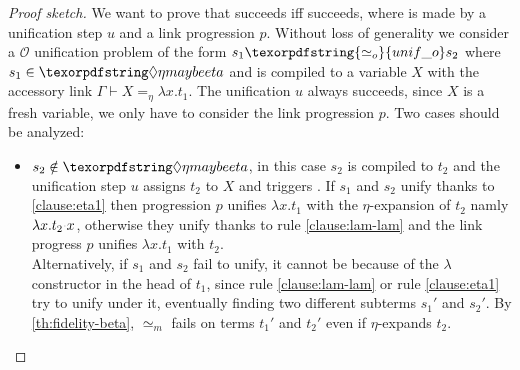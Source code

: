 \documentclass[sigconf,natbib=false,review]{acmart}
\newcommand{\appsep}{\ensuremath{\textcolor{lightgray}{\cdot}}}
\newcommand{\UnifRel}{\ensuremath{\simeq}}
\newcommand{\Uo}{\texorpdfstring{\ensuremath{\UnifRel_o}\xspace}{unif\_o}}
\newcommand{\Ue}{\ensuremath{\UnifRel_m}\xspace}
\newcommand{\Fo}{\texorpdfstring{\ensuremath{\mathcal{O}}\xspace}{O}}
\newcommand{\linketaM}[3]{\ensuremath{#1 \vdash #2 =_\eta #3}}
\newcommand{\linkStore}{\texorpdfstring{\ensuremath{\mathbb{L}}\xspace}{L}}
\newcommand{\hoUnifPb}{\ensuremath{\mathbb{Q}}\xspace}
\begin{document}
\begin{proof}[Proof sketch] %
  We want to prove that \fstep succeeds iff \hstep
  succeeds, where \hstep is made by a unification step $u$ and a link
  progression $p$.
  Without loss of generality we consider a
  \Fo{} unification problem of the form $s_1 \Uo s_2$
  where $s_1 \in \maybeeta$ and is compiled to a variable $X$ with the accessory link
  $\linketaM{\Gamma}{X}{\lambda x.t_1}$. 
  The unification $u$ always succeeds, since $X$ is a fresh variable, we 
  only have to consider the link progression $p$.
  Two cases should be analyzed:
  \begin{itemize}
    \item $s_2 \notin \maybeeta$,
          in this case $s_2$ is compiled to $t_2$ and the unification step $u$ assigns $t_2$ to $X$
          and triggers \progressetaleft.
          If $s_1$ and $s_2$ unify thanks to \ref{clause:eta1} then
          progression $p$ unifies $\lambda x.t_1$ with the $\eta$-expansion of $t_2$ namly
          $\lambda x.t_2\appsep x$, otherwise they unify thanks to rule \ref{clause:lam-lam}
          and the link progress $p$ unifies $\lambda x.t_1$ with $t_2$.\\ Alternatively, if $s_1$ and $s_2$ fail
          to unify, it cannot be because of the $\lambda$ constructor in the head of $t_1$,
          since rule \ref{clause:lam-lam} or rule \ref{clause:eta1} try to unify under it, eventually finding two
          different subterms $s_1'$ and $s_2'$. By \cref{th:fidelity-beta},
          \Ue fails on terms $t_1'$ and $t_2'$ even if \progressetaleft
          $\eta$-expands $t_2$.



\end{itemize}
\end{proof}
\end{document}
